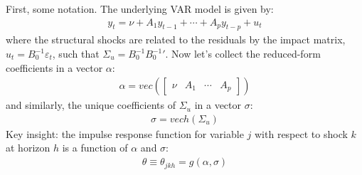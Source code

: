 First, some notation.
The underlying VAR model is given by:
\begin{align*}
y_t = \nu + A_1 y_{t-1} + \cdots  + A_p y_{t-p} + u_{t}
\end{align*}
where the structural shocks are related to the residuals by the impact matrix, \(u_{t}=B_{0}^{-1} \varepsilon_t\),
  such that \(\Sigma_u = B_{0}^{-1} {B_{0}^{-1}}'\).
Now let's collect the reduced-form coefficients in a vector \(\alpha \):
\begin{align*}
  \alpha = vec\left(\begin{bmatrix} \nu & A_1 & \cdots  & A_p  \end{bmatrix} \right)
\end{align*}
and similarly, the unique coefficients of \(\Sigma_u\) in a vector \(\sigma \):
\begin{align*}
  \sigma = vech\left(\Sigma_u\right)
\end{align*}
Key insight: the impulse response function for variable \(j\) with respect to shock \(k\) at horizon \(h\) is a function of \(\alpha \) and \(\sigma \):
\begin{align*}
\theta \equiv \theta_{jkh} = g(\alpha,\sigma)
\end{align*}

